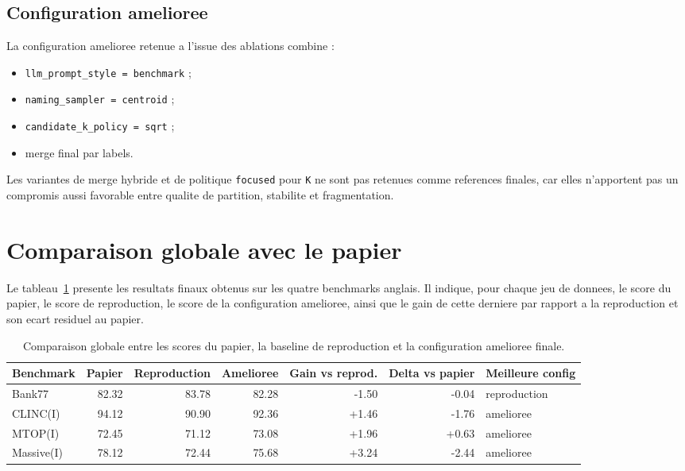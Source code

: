 \subsection{Configuration amelioree}

La configuration amelioree retenue a l'issue des ablations combine :
\begin{itemize}[leftmargin=*]
  \item \texttt{llm\_prompt\_style = benchmark} ;
  \item \texttt{naming\_sampler = centroid} ;
  \item \texttt{candidate\_k\_policy = sqrt} ;
  \item merge final par labels.
\end{itemize}

Les variantes de merge hybride et de politique \texttt{focused} pour
\texttt{K} ne sont pas retenues comme references finales, car elles
n'apportent pas un compromis aussi favorable entre qualite de partition,
stabilite et fragmentation.

\section{Comparaison globale avec le papier}

Le tableau~\ref{tab:global-comparison} presente les resultats finaux obtenus
sur les quatre benchmarks anglais. Il indique, pour chaque jeu de donnees, le
score du papier, le score de reproduction, le score de la configuration
amelioree, ainsi que le gain de cette derniere par rapport a la reproduction et
son ecart residuel au papier.

\begin{table}[h]
  \centering
  \small
  \begin{tabular}{lrrrrrl}
    \toprule
    Benchmark & Papier & Reproduction & Amelioree & Gain vs reprod. & Delta vs papier & Meilleure config \\
    \midrule
    Bank77 & 82.32 & 83.78 & 82.28 & -1.50 & -0.04 & reproduction \\
    CLINC(I) & 94.12 & 90.90 & 92.36 & +1.46 & -1.76 & amelioree \\
    MTOP(I) & 72.45 & 71.12 & 73.08 & +1.96 & +0.63 & amelioree \\
    Massive(I) & 78.12 & 72.44 & 75.68 & +3.24 & -2.44 & amelioree \\
    \bottomrule
  \end{tabular}
  \caption{Comparaison globale entre les scores du papier, la baseline de reproduction et la configuration amelioree finale.}
  \label{tab:global-comparison}
\end{table}

